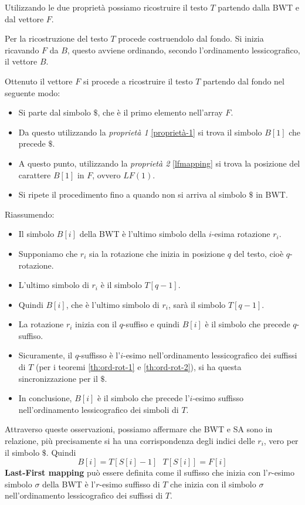Utilizzando le due proprietà possiamo ricostruire il testo $T$ partendo dalla
BWT e dal vettore $F$.
\begin{esempio} 
    Per la ricostruzione del testo $T$ procede costruendolo dal fondo. Si inizia
    ricavando $F$ da $B$, questo avviene ordinando, secondo l'ordinamento
    lessicografico, il vettore $B$.

    Ottenuto il vettore $F$ si procede a ricostruire il testo $T$ partendo dal
    fondo nel seguente modo:
    \begin{itemize}
        \item Si parte dal simbolo $\$$, che è il primo elemento nell'array $F$.
        \item Da questo utilizzando la \textit{proprietà 1} \ref{proprietà-1} si
              trova il simbolo $B[1]$ che precede $\$$.
        \item A questo punto, utilizzando la \textit{proprietà 2} \ref{lfmapping}
              si trova la posizione del carattere $B[1]$ in $F$, ovvero $LF(1)$.
        \item Si ripete il procedimento fino a quando non si arriva al simbolo
              $\$$ in BWT.
    \end{itemize}
\end{esempio}
Riassumendo:
\begin{itemize}
    \item Il simbolo $B[i]$ della BWT è l'ultimo simbolo della $i$-esima rotazione
          $r_i$.
    \item Supponiamo che $r_i$ sia la rotazione che inizia in posizione $q$ del
          testo, cioè $q$-rotazione.
    \item L'ultimo simbolo di $r_i$ è il simbolo $T[q - 1]$.
    \item Quindi $B[i]$, che è l'ultimo simbolo di $r_i$, sarà il simbolo $T[q - 1]$.
    \item La rotazione $r_i$ inizia con il $q$-suffiso e quindi $B[i]$ è il simbolo
          che precede $q$-suffiso.
    \item Sicuramente, il $q$-suffisso è l'$i$-esimo nell'ordinamento lessicografico
          dei suffissi di $T$ (per i teoremi \ref{th:ord-rot-1} e \ref{th:ord-rot-2}), si ha questa
          sincronizzazione per il $\$$.
    \item In conclusione, $B[i]$ è il simbolo che precede l'$i$-esimo suffisso
          nell'ordinamento lessicografico dei simboli di $T$.
\end{itemize}
Attraverso queste osservazioni, possiamo affermare che BWT e SA sono in relazione,
più precisamente si ha una corrispondenza degli indici delle $r_i$, vero per il
simbolo $\$$. Quindi
\begin{equation}
    B[i] = T[S[i]-1] \ \ \ T[S[i]] = F[i]
\end{equation}
\textbf{Last-First mapping} può essere definita come il suffisso che inizia con
l'$r$-esimo simbolo $\sigma$ della BWT è l'$r$-esimo suffisso di $T$ che inizia
con il simbolo $\sigma$ nell'ordinamento lessicografico dei suffissi di $T$.

